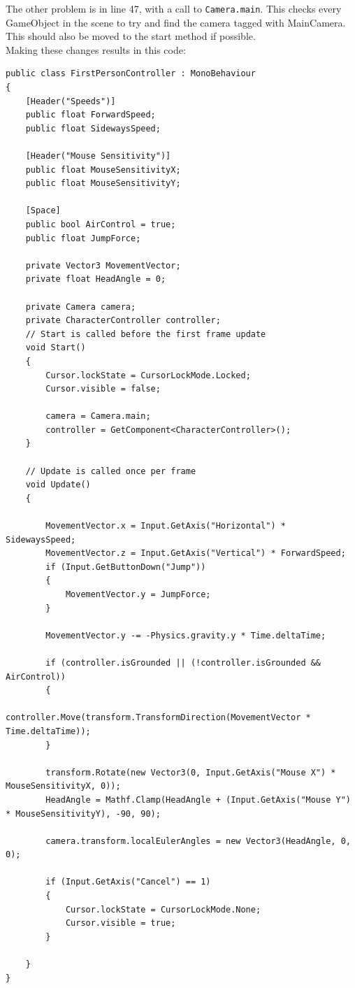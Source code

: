 \documentclass{article}
\begin{document}
The other problem is in line 47, with a call to \lstinline[basicstyle=\footnotesize]{Camera.main}. This checks every GameObject in the scene to try and find the camera tagged with MainCamera. This should also be moved to the start method if possible.\\
Making these changes results in this code:
\begin{lstlisting}[language={[Sharp]C}, label={Script}]
public class FirstPersonController : MonoBehaviour
{
    [Header("Speeds")]
    public float ForwardSpeed;
    public float SidewaysSpeed;

    [Header("Mouse Sensitivity")]
    public float MouseSensitivityX;
    public float MouseSensitivityY;

    [Space]
    public bool AirControl = true;
    public float JumpForce;

    private Vector3 MovementVector;
    private float HeadAngle = 0;

    private Camera camera;
    private CharacterController controller;
    // Start is called before the first frame update
    void Start()
    {        
        Cursor.lockState = CursorLockMode.Locked;
        Cursor.visible = false;

        camera = Camera.main;
        controller = GetComponent<CharacterController>();
    }

    // Update is called once per frame
    void Update()
    {
        
        MovementVector.x = Input.GetAxis("Horizontal") * SidewaysSpeed;
        MovementVector.z = Input.GetAxis("Vertical") * ForwardSpeed;
        if (Input.GetButtonDown("Jump"))
        {
            MovementVector.y = JumpForce;
        }

        MovementVector.y -= -Physics.gravity.y * Time.deltaTime;

        if (controller.isGrounded || (!controller.isGrounded && AirControl))
        {
            controller.Move(transform.TransformDirection(MovementVector * Time.deltaTime));
        }

        transform.Rotate(new Vector3(0, Input.GetAxis("Mouse X") * MouseSensitivityX, 0));
        HeadAngle = Mathf.Clamp(HeadAngle + (Input.GetAxis("Mouse Y") * MouseSensitivityY), -90, 90);

        camera.transform.localEulerAngles = new Vector3(HeadAngle, 0, 0);

        if (Input.GetAxis("Cancel") == 1)
        {
            Cursor.lockState = CursorLockMode.None;
            Cursor.visible = true;
        }

    }
}
\end{lstlisting}
\end{document}
